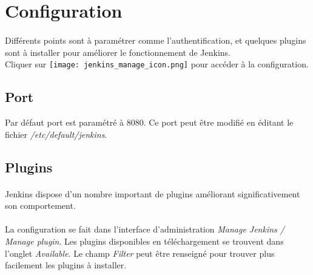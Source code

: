 \documentclass{article}
\begin{document}
\newpage
\section{Configuration}\label{configuration}
\paragraph{}
Différents points sont à paramétrer comme l'authentification, et quelques plugins sont à installer pour améliorer le fonctionnement de Jenkins.\\  
Cliquer sur \texttt{[image: jenkins\_manage\_icon.png]} pour accéder à la configuration.\\

\subsection{Port}
Par défaut port est paramétré à 8080. Ce port peut être modifié en éditant le fichier \textit{/etc/default/jenkins}.

\subsection{Plugins}
\paragraph{}Jenkins dispose d'un nombre important de plugins améliorant significativement son comportement.

\paragraph{}La configuration se fait dans l'interface d'administration \textit{Manage Jenkins / Manage plugin}. Les plugins disponibles en téléchargement se trouvent dans l'onglet \textit{Available}. Le champ \textit{Filter} peut être renseigné pour trouver plus facilement les plugins à installer.
\end{document}
